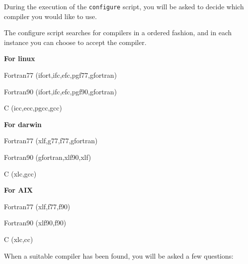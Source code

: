 During the execution of the \verb|configure| script, you will be
asked to decide which compiler you would like to use. 

The configure script searches for compilers in a ordered fashion, and in each instance you can choose to accept the compiler. 

{\bf For linux}
\begin{description}
\item{Fortran77} (ifort,ifc,efc,pgf77,gfortran)
\item{Fortran90} (ifort,ifc,efc,pgf90,gfortran)
\item{C} (icc,ecc,pgcc,gcc)
\end{description}

{\bf For darwin}
\begin{description}
\item{Fortran77} (xlf,g77,f77,gfortran)
\item{Fortran90} (gfortran,xlf90,xlf)
\item{C} (xlc,gcc)
\end{description}

{\bf For AIX}
\begin{description}
\item{Fortran77} (xlf,f77,f90)
\item{Fortran90} (xlf90,f90)
\item{C} (xlc,cc)
\end{description}

When a suitable compiler has been found, you will be asked a few questions:


